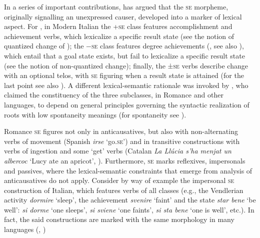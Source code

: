 \documentclass[output=paper,colorlinks,citecolor=brown
]{langscibook}
\begin{document}
In a series of important contributions, \citet{cennamo1995patterns,cennamo1999late,cennamo2012aspectual,cennamo2015valency,cennamo2021anticausatives,cennamo2022anticausativization} has argued that the \textsc{se} morpheme, originally signalling an unexpressed causer, developed into a marker of lexical aspect. For \citet{cennamo2012aspectual}, in Modern Italian the +\textsc{se} class features accomplishment and achievement verbs, which lexicalize a specific result state (see the notion of quantized change of \cite{hay1999scalar,beavers2011affectedness}); the −\textsc{se} class features degree achievements 
(\cite[88--90]{dowty1979word}, see also \cite{bertinetto1995attempt,hay1999scalar,beavers2011affectedness}), which entail that a goal state exists, but fail to lexicalize a specific result state (see the notion of non-quantized change);  finally, the ±\textsc{se} verbs describe change with an optional telos, with \textsc{se} figuring when a result state is attained (for the last point see also \cites[{}][161--163]{folli2002constructing,jezek2003classi}). A different lexical-semantic rationale was invoked by \citet[96, 114--120]{alexiadou2015external}, who claimed the constituency of the three subclasses, in Romance and other languages, to depend on general principles governing the syntactic realization of roots with low spontaneity meanings (for spontaneity see \cite{haspelmath1993more,haspelmath2016universals}). 

Romance \textsc{se} figures not only in anticausatives, but also with non-alternating verbs of movement (Spanish \textit{irse} ‘go.\textsc{se}’) and in transitive constructions with verbs of ingestion and some ‘get’ verbs \citep[48]{levin1993english} (Catalan \textit{La Llúcia s’ha menjat un albercoc} ‘Lucy ate an apricot’, \cite[505]{acedomatellan2022argument}). Furthermore, \textsc{se} marks reflexives, impersonals and passives, where the lexical-semantic constraints that emerge from analysis of anticausatives do not apply. Consider by way of example the impersonal \textsc{se} construction of Italian, which features verbs of all classes (e.g., the Vendlerian activity \textit{dormire} ‘sleep’, the achievement \textit{svenire} ‘faint’ and the state \textit{star bene} ‘be well’: \textit{si dorme} ‘one sleeps’, \textit{si sviene} ‘one faints’, \textit{si sta bene} ‘one is well’, etc.). In fact, the said constructions are marked with the same morphology in many languages (\cite[371--374]{lyons1969introduction}, \cite{kemmer1993middle,beavers2023middle}) 
\end{document}
